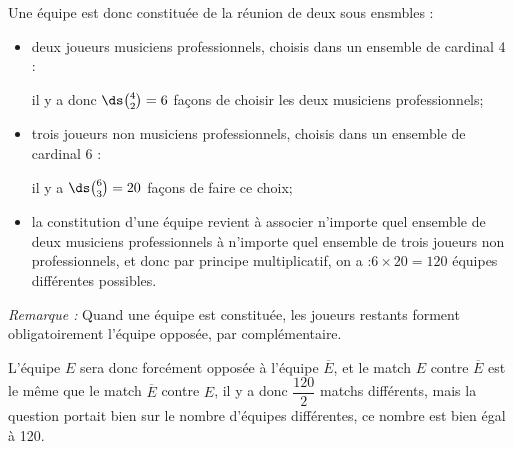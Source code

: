 \begin{enumerate}
	Une équipe est donc constituée de la réunion de deux sous ensmbles :
	\begin{itemize}
		\item deux joueurs musiciens professionnels, choisis dans un ensemble de cardinal 4 :

		il y a donc $\ds \binom{4}{2} = 6$ façons de choisir les deux musiciens professionnels;
		\item trois joueurs non musiciens professionnels, choisis dans un ensemble de cardinal 6 :

		il y a $\ds \binom{6}{3} = 20$ façons de faire ce choix;

		\item la constitution d'une équipe revient à associer n'importe quel ensemble de deux musiciens professionnels à n'importe quel ensemble de trois joueurs non professionnels, et donc par principe multiplicatif, on a :\quad $6 \times 20 = 120$ équipes différentes possibles.
	\end{itemize}

	\emph{Remarque :} Quand une équipe est constituée, les joueurs restants forment obligatoirement l'équipe opposée, par complémentaire.

	L'équipe $E$ sera donc forcément opposée à l'équipe $\overline{E}$, et le match $E$ contre $\overline{E}$ est le même que le match $\overline{E}$ contre $E$, il y a donc $\dfrac{120}{2}$ matchs différents, mais la question portait bien sur le nombre d'équipes différentes, ce nombre est bien égal à 120.


\end{enumerate}
